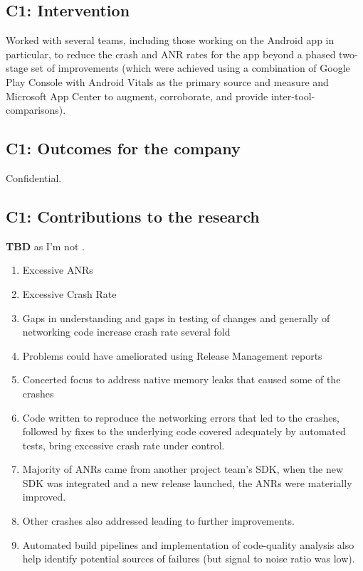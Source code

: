 \subsection{C1: Intervention}
Worked with several teams, including those working on the Android app in particular, to reduce the crash and ANR rates for the app beyond a phased two-stage set of improvements (which were achieved using a combination of Google Play Console with Android Vitals as the primary source and measure and Microsoft App Center to augment, corroborate, and provide inter-tool-comparisons).

\subsection{C1: Outcomes for the company}
Confidential.

\subsection{C1: Contributions to the research}
\textbf{TBD} as I'm not .

\begin{enumerate}
    \item Excessive ANRs
    \item Excessive Crash Rate
    \item Gaps in understanding and gaps in testing of changes and generally of networking code increase crash rate several fold
    \item Problems could have ameliorated using Release Management reports
    \item Concerted focus to address native memory leaks that caused some of the crashes
    \item Code written to reproduce the networking errors that led to the crashes, followed by fixes to the underlying code covered adequately by automated tests, bring excessive crash rate under control.
    \item Majority of ANRs came from another project team's SDK, when the new SDK was integrated and a new release launched, the ANRs were materially improved. 
    \item Other crashes also addressed leading to further improvements.
    \item Automated build pipelines and implementation of code-quality analysis also help identify potential sources of failures (but signal to noise ratio was low).
\end{enumerate}

